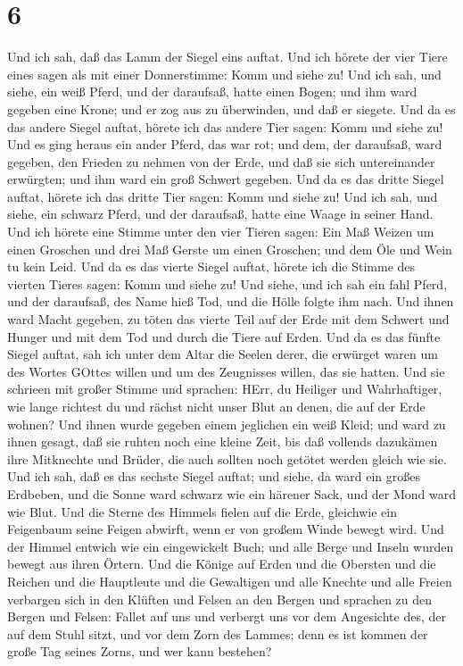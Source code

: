 \hypertarget{section-4}{%
\section{6}\label{section-4}}

 Und ich sah, daß das Lamm der Siegel eins auftat. Und ich
hörete der vier Tiere eines sagen als mit einer Donnerstimme: Komm und
siehe zu!  Und ich sah, und siehe, ein weiß Pferd, und der
daraufsaß, hatte einen Bogen; und ihm ward gegeben eine Krone; und er
zog aus zu überwinden, und daß er siegete.  Und da es das
andere Siegel auftat, hörete ich das andere Tier sagen: Komm und siehe
zu!  Und es ging heraus ein ander Pferd, das war rot; und
dem, der daraufsaß, ward gegeben, den Frieden zu nehmen von der Erde,
und daß sie sich untereinander erwürgten; und ihm ward ein groß Schwert
gegeben.  Und da es das dritte Siegel auftat, hörete ich das
dritte Tier sagen: Komm und siehe zu! Und ich sah, und siehe, ein
schwarz Pferd, und der daraufsaß, hatte eine Waage in seiner Hand.
 Und ich hörete eine Stimme unter den vier Tieren sagen: Ein
Maß Weizen um einen Groschen und drei Maß Gerste um einen Groschen; und
dem Öle und Wein tu kein Leid.  Und da es das vierte Siegel
auftat, hörete ich die Stimme des vierten Tieres sagen: Komm und siehe
zu!  Und siehe, und ich sah ein fahl Pferd, und der
daraufsaß, des Name hieß Tod, und die Hölle folgte ihm nach. Und ihnen
ward Macht gegeben, zu töten das vierte Teil auf der Erde mit dem
Schwert und Hunger und mit dem Tod und durch die Tiere auf Erden.
 Und da es das fünfte Siegel auftat, sah ich unter dem Altar
die Seelen derer, die erwürget waren um des Wortes GOttes willen und um
des Zeugnisses willen, das sie hatten.  Und sie schrieen
mit großer Stimme und sprachen: HErr, du Heiliger und Wahrhaftiger, wie
lange richtest du und rächst nicht unser Blut an denen, die auf der Erde
wohnen?  Und ihnen wurde gegeben einem jeglichen ein weiß
Kleid; und ward zu ihnen gesagt, daß sie ruhten noch eine kleine Zeit,
bis daß vollends dazukämen ihre Mitknechte und Brüder, die auch sollten
noch getötet werden gleich wie sie.  Und ich sah, daß es
das sechste Siegel auftat; und siehe, da ward ein großes Erdbeben, und
die Sonne ward schwarz wie ein härener Sack, und der Mond ward wie Blut.
 Und die Sterne des Himmels fielen auf die Erde, gleichwie
ein Feigenbaum seine Feigen abwirft, wenn er von großem Winde bewegt
wird.  Und der Himmel entwich wie ein eingewickelt Buch;
und alle Berge und Inseln wurden bewegt aus ihren Örtern. 
Und die Könige auf Erden und die Obersten und die Reichen und die
Hauptleute und die Gewaltigen und alle Knechte und alle Freien verbargen
sich in den Klüften und Felsen an den Bergen  und sprachen
zu den Bergen und Felsen: Fallet auf uns und verbergt uns vor dem
Angesichte des, der auf dem Stuhl sitzt, und vor dem Zorn des Lammes;
 denn es ist kommen der große Tag seines Zorns, und wer
kann bestehen?

